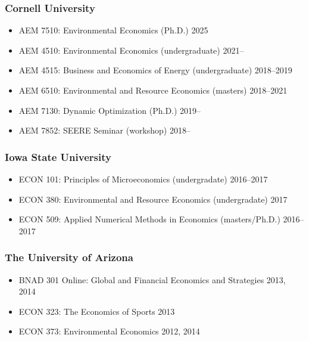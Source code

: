 \documentclass[11pt]{res} %
\begin{document}
\begin{resume}
\subsubsection{Cornell University}
\begin{itemize} \itemsep -1pt
	\item[] AEM 7510: Environmental Economics (Ph.D.) \hfill 2025
	\item[] AEM 4510: Environmental Economics (undergraduate) \hfill 2021--
	\item[] AEM 4515: Business and Economics of Energy (undergraduate) \hfill 2018--2019
	\item[] AEM 6510: Environmental and Resource Economics (masters) \hfill 2018--2021
	\item[] AEM 7130: Dynamic Optimization (Ph.D.) \hfill 2019--
	\item[] AEM 7852: SEERE Seminar (workshop) \hfill 2018--
\end{itemize}\vspace{-.3in}
\subsubsection{Iowa State University}
\begin{itemize} \itemsep -1pt
	\item[] ECON 101: Principles of Microeconomics (undergradate) \hfill 2016--2017
	\item[] ECON 380: Environmental and Resource Economics (undergradate) \hfill 2017
	\item[] ECON 509: Applied Numerical Methods in Economics (masters/Ph.D.) \hfill 2016--2017
\end{itemize}\vspace{-.3in}
\subsubsection{The University of Arizona}
\begin{itemize} \itemsep -1pt %
	\item[] BNAD 301 Online: Global and Financial Economics and Strategies \hfill 2013, 2014
	\item[] ECON 323: The Economics of Sports \hfill 2013
	\item[] ECON 373: Environmental Economics \hfill 2012, 2014
\end{itemize}

\vspace{-.2in}


\end{resume}
\end{document}
